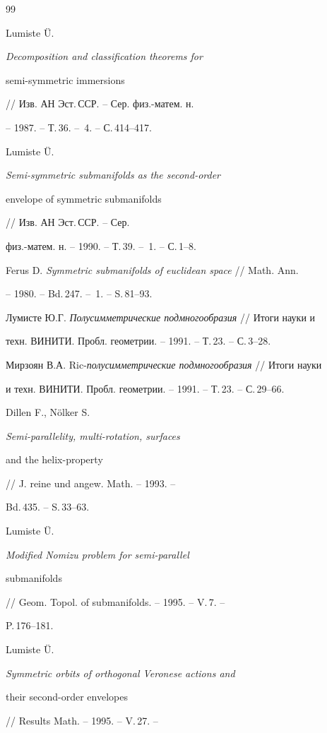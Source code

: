 \begin{thebibliography}{99} 


 




Lumiste \"U. {\em Decomposition and classification theorems for 


semi-symmetric immersions} // Изв. АН Эст.\,ССР. -- Сер. физ.-матем. н. 


-- 1987. -- Т.\,36. -- \No\,4. -- С.\,414--417. 




Lumiste \"U. {\em Semi-symmetric submanifolds as the second-order 


envelope of symmetric submanifolds} // Изв. АН Эст.\,ССР. -- Сер. 


физ.-матем. н. -- 1990. -- Т.\,39. -- \No\,1. -- С.\,1--8. 




Ferus D. {\em Symmetric submanifolds of euclidean space} // Math. Ann. 


-- 1980. -- Bd.\,247. -- \No\,1. -- S.\,81--93. 




Лумисте Ю.Г. {\em Полусимметрические подмногообразия} // Итоги науки и 


техн. ВИНИТИ. Пробл. геометрии. -- 1991. -- Т.\,23. -- С.\,3--28. 




Мирзоян В.А. Ric-{\em полусимметрические подмногообразия} // Итоги науки 


и техн. ВИНИТИ. Пробл. геометрии. -- 1991. -- Т.\,23. -- С.\,29--66. 




Dillen F., N\"olker S. {\em Semi-parallelity, multi-rotation, surfaces 


and the helix-property} // J. reine und angew. Math. -- 1993. -- 


Bd.\,435. -- S.\,33--63. 




Lumiste \"U. {\em Modified Nomizu problem for semi-parallel 


submanifolds} // Geom. Topol. of submanifolds. -- 1995. -- V.\,7. -- 


P.\,176--181. 




Lumiste \"U. {\em Symmetric orbits of orthogonal Veronese actions and 


their second-order envelopes} // Results Math. -- 1995. -- V.\,27. -- 



\end{thebibliography}
